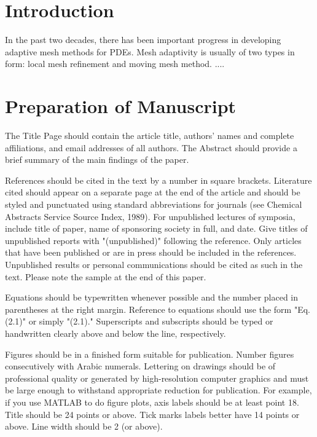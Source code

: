\documentclass[mathpazo]{cicp}
\begin{document}
\maketitle


\section{Introduction}
\label{sec1}
In the past two decades, there has been important progress in developing adaptive mesh methods for PDEs.
Mesh adaptivity is usually of two types in form: local mesh refinement and moving mesh method.  ....

\section{Preparation of Manuscript}
\label{sec2}
The Title Page should contain the article title, authors' names and complete affiliations,
and email addresses of all authors. The Abstract should provide a brief summary of the main findings of the paper.

References should be cited in the text by a number in square brackets.
Literature cited should appear on a separate page at the end of the article
and should be styled and punctuated using standard abbreviations for journals
(see Chemical Abstracts Service Source Index, 1989). For unpublished lectures of symposia,
include title of paper, name of sponsoring society in full, and date.
Give titles of unpublished reports with "(unpublished)" following the reference.
Only articles that have been published or are in press should be included in the references.
Unpublished results or personal communications should be cited as such in the text.
Please note the sample at the end of this paper.

Equations should be typewritten whenever possible and the number placed in parentheses at the right margin.
Reference to equations should use the form "Eq. (2.1)" or simply "(2.1)." Superscripts and subscripts should
be typed or handwritten clearly above and below the line, respectively.

Figures should be in a finished form suitable for publication. Number figures consecutively with Arabic numerals.
Lettering on drawings should be of professional quality or generated by high-resolution computer graphics and must be
large enough to withstand appropriate reduction for publication.
For example, if you use {\sf MATLAB} to do figure plots,
axis labels should be at least point 18. Title should be 24 points or above. Tick marks labels
better have 14 points or above. Line width should be 2 (or above).
\end{document}
